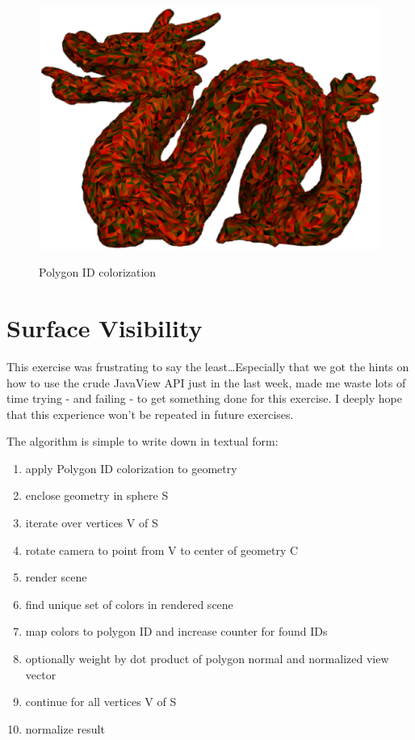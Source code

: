 \documentclass[a4paper,10pt,notitlepage]{scrreprt}
\begin{document}
\begin{figure}
{            \includegraphics[scale=0.4]{dragon-polygonid.eps} }

  \caption{Polygon ID colorization}
\end{figure}

\pagebreak

\section{Surface Visibility}

This exercise was frustrating to say the least\dots Especially that we got the
hints on how to use the crude JavaView API just in the last week, made me waste
lots of time trying - and failing - to get something done for this exercise. I
deeply hope that this experience won't be repeated in future exercises.

The algorithm is simple to write down in textual form:

\begin{enumerate}
 \item apply Polygon ID colorization to geometry
 \item enclose geometry in sphere S
 \item iterate over vertices V of S
 \item rotate camera to point from V to center of geometry C
 \item render scene
 \item find unique set of colors in rendered scene
 \item map colors to polygon ID and increase counter for found IDs
 \item optionally weight by dot product of polygon normal and normalized view
vector
 \item continue for all vertices V of S 
 \item normalize result
\end{enumerate}
\end{document}
